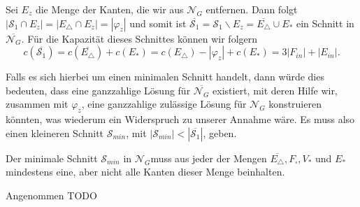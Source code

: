 Sei $E_z$ die Menge der Kanten, die wir aus $\mathcal{N}_G$ entfernen. Dann folgt $|\mathcal{S}_1 \cap E_z| = |E_\triangle \cap E_z| = |\varphi_z|$ und somit ist $\overline{\mathcal{S}_1} = \mathcal{S}_1 \backslash E_z = \overline{E_\triangle} \cup E_*$ ein Schnitt in $\overline{\mathcal{N}_G}$. Für die Kapazität dieses Schnittes können wir folgern $$ c(\overline{\mathcal{S}_1}) = c(\overline{E_\triangle}) + c(E_*) = c(E_\triangle) - |\varphi_z| + c(E_*) = 3|F_{in}| + |E_{in}|.$$

Falls es sich hierbei um einen minimalen Schnitt handelt, dann würde dies bedeuten, dass eine ganzzahlige Lösung für $\overline{\mathcal{N}_G}$ existiert, mit deren Hilfe wir, zusammen mit $\varphi_z$, eine ganzzahlige zulässige Lösung für $\mathcal{N}_G$ konstruieren könnten, was wiederum ein Widerspruch zu unserer Annahme wäre. Es muss also einen kleineren Schnitt $\mathcal{S}_{min}$, mit $|\mathcal{S}_{min}| < |\overline{\mathcal{S}_1}|$, geben. 

\begin{claim}

Der minimale Schnitt $\mathcal{S}_{min}$ in $\mathcal{N}_G$muss aus jeder der Mengen $\overline{E_\triangle}, F_\square, V_*$ und $E_*$ mindestens eine, aber nicht alle Kanten dieser Menge beinhalten.

\end{claim}

Angenommen  TODO




